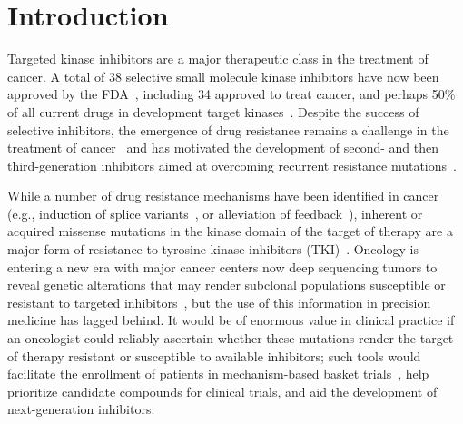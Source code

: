\documentclass[phd,tocprelim]{cornell}
\begin{document}
\section{Introduction}

Targeted kinase inhibitors are a major therapeutic class in the treatment of cancer.
A total of 38 selective small molecule kinase inhibitors have now been approved by the FDA~\citep{fda-approved-kinase-inhibitors}, including 34 approved to treat cancer, and perhaps 50\% of all current drugs in development target kinases~\citep{Santos:Nat.Rev.DrugDiscov.:2016}.
Despite the success of selective inhibitors, the emergence of drug resistance remains a challenge in the treatment of cancer~\citep{Shah:CancerCell:2002,BUCZEK201431,huang2015mechanisms,Meyer2051,Davare29092015,VanAllen94,Rani3821,Holohan:Nat.Rev.Cancer:2013} and has motivated the development of second- and then third-generation inhibitors aimed at overcoming recurrent resistance mutations~\citep{Weisberg:Nat.Rev.Cancer:2007,Y.Lu:Curr.Med.Chem.:2011,Juchum:DrugResist.Updat.:2015,Song:ActaPharm.Sin.B:2015,Neel:NpjPrecis.Oncol.:2017}.   

While a number of drug resistance mechanisms have been identified in cancer (e.g., induction of splice variants~\citep{Gruber2006}, or alleviation of feedback~\citep{Chandarlapaty:CancerCell:2011}), inherent or acquired missense mutations in the kinase domain of the target of therapy are a major form of resistance to tyrosine kinase inhibitors (TKI)~\citep{Knight:Nat.Rev.Cancer:2010,Holohan:Nat.Rev.Cancer:2013,Housman:Cancers:2014}.
Oncology is entering a new era with major cancer centers now deep sequencing tumors to reveal genetic alterations that may render subclonal populations susceptible or resistant to targeted inhibitors~\citep{Zehir:Nat.Med.:2017}, but the use of this information in precision medicine has lagged behind. 
It would be of enormous value in clinical practice if an oncologist could reliably ascertain whether these mutations render the target of therapy resistant or susceptible to available inhibitors; such tools would facilitate the enrollment of patients in mechanism-based basket trials~\citep{Redig::2015,Hyman:Cell:2017}, help prioritize candidate compounds for clinical trials, and aid the development of next-generation inhibitors. 
\end{document}
